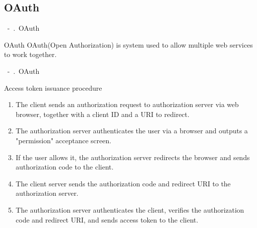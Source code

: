 \documentclass{beamer}
\newcommand{\shownum}{\thesection\ -\ \thesubsection.\ }
\begin{document}
\subsection{OAuth}
\begin{frame}{\shownum OAuth}
    \begin{exampleblock}{OAuth}
        OAuth(Open Authorization) is system used to allow multiple web services to work together.
    \end{exampleblock}
    \begin{figure}[h]
        \centering
    \end{figure}
\end{frame}
\begin{frame}{\shownum OAuth}
    \begin{block}{Access token issuance procedure}
        \begin{enumerate}
            \item The client sends an authorization request to authorization server via web browser, together with a client ID and a URI to redirect.
            \item The authorization server authenticates the user via a browser and outputs a "permission" acceptance screen.
            \item If the user allows it, the authorization server redirects the browser and sends authorization code to the client.
            \item The client server sends the authorization code and redirect URI to the authorization server.
            \item The authorization server authenticates the client, verifies the authorization code and redirect URI, and sends access token to the client.
        \end{enumerate}
    \end{block}
\end{frame}
\end{document}
